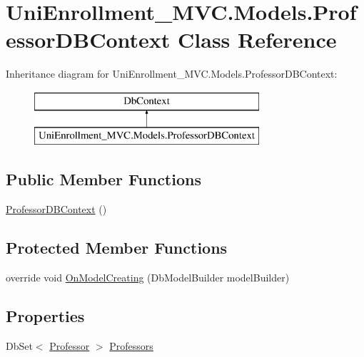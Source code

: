 \hypertarget{class_uni_enrollment___m_v_c_1_1_models_1_1_professor_d_b_context}{}\section{Uni\+Enrollment\+\_\+\+M\+V\+C.\+Models.\+Professor\+D\+B\+Context Class Reference}
\label{class_uni_enrollment___m_v_c_1_1_models_1_1_professor_d_b_context}
Inheritance diagram for Uni\+Enrollment\+\_\+\+M\+V\+C.\+Models.\+Professor\+D\+B\+Context\+:\begin{figure}[H]
\begin{center}
\leavevmode
\includegraphics[height=2.000000cm]{class_uni_enrollment___m_v_c_1_1_models_1_1_professor_d_b_context}
\end{center}
\end{figure}
\subsection*{Public Member Functions}
\begin{DoxyCompactItemize}
\item 
\hyperlink{class_uni_enrollment___m_v_c_1_1_models_1_1_professor_d_b_context_a2c36d9e40760c9e937839d80273373be}{Professor\+D\+B\+Context} ()
\end{DoxyCompactItemize}
\subsection*{Protected Member Functions}
\begin{DoxyCompactItemize}
\item 
override void \hyperlink{class_uni_enrollment___m_v_c_1_1_models_1_1_professor_d_b_context_a5579a7ea482aa10fbc1e06b185d85179}{On\+Model\+Creating} (Db\+Model\+Builder model\+Builder)
\end{DoxyCompactItemize}
\subsection*{Properties}
\begin{DoxyCompactItemize}
\item 
Db\+Set$<$ \hyperlink{class_uni_enrollment___m_v_c_1_1_models_1_1_professor}{Professor} $>$ \hyperlink{class_uni_enrollment___m_v_c_1_1_models_1_1_professor_d_b_context_ae43a089ed6de4a4dfb6712b8a908626c}{Professors}
\end{DoxyCompactItemize}


